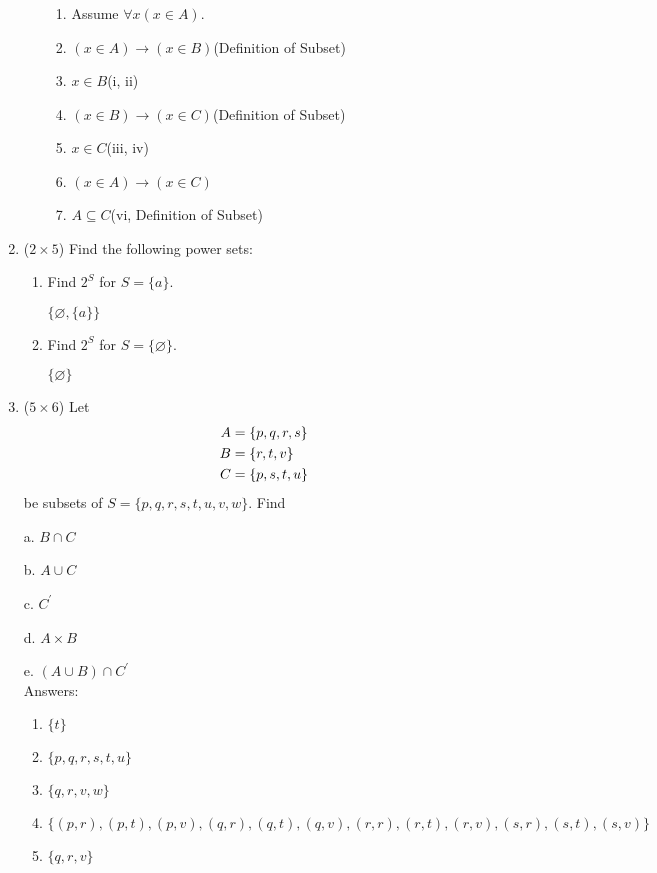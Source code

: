 \documentclass[12pt]{article}
\begin{document}
\begin{enumerate}
		\begin{enumerate}
			\begin{enumerate}
				\item Assume $\forall x(x \in A)$.
				\item $(x \in A) \to (x \in B)$\hfill(Definition of Subset)
				\item $x \in B$\hfill(i, ii)
				\item $(x \in B) \to (x \in C)$\hfill(Definition of Subset)
				\item $x \in C$\hfill(iii, iv)
				\item $(x \in A) \to (x \in C)$
				\item $A \subseteq C$\hfill(vi, Definition of Subset)
			\end{enumerate}
		\end{enumerate}
		\clearpage


		\item ($2 \times 5$) Find the following power sets:
		\begin{enumerate}
			\item
			Find  $2^S$ for $S = \{a\}$.

			$\{\varnothing, \{a\}\}$

			\item
			Find  $2^S$ for $S = \{\varnothing\}$.

			$\{\varnothing\}$

		\end{enumerate}
		\clearpage



		\item ($5 \times 6$)
		Let
		\begin{align*}
		\centering
		A &= \{p, q, r, s\}\\
		B &= \{r, t, v\}\\
		C &= \{p, s, t, u\}
		\end{align*}
		be subsets of $S = \{p, q, r, s, t, u, v, w\}$. Find
		\begin{multicols}{3}
			a. $B \cap C$

			b. $A \cup C$

			c. $C^{\prime}$

			d. $A \times B$

			e. $\left(A \cup B\right) \cap C^{\prime}$
		\\	Answers:

		\begin{enumerate}
			\item $\{t\}$
			\item $\{p, q, r, s, t, u\}$
			\item $\{q, r, v, w\}$
			\item $\{(p, r), (p, t), (p, v), (q, r), (q, t), (q, v), (r, r), (r, t), (r, v), (s, r), (s, t), (s, v)\}$
			\item $\{q, r, v\}$
		\end{enumerate}
			\clearpage
		\end{multicols}



\end{enumerate}
\end{document}
